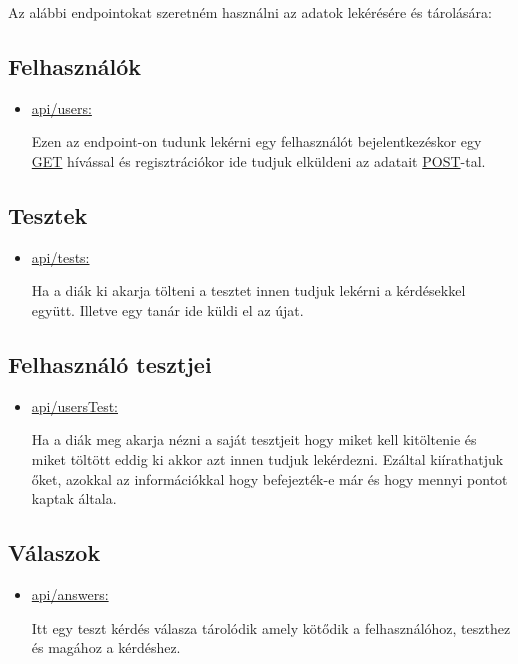 
Az alábbi endpointokat szeretném használni az adatok lekérésére és tárolására:
\subsection{Felhasználók}
\begin{itemize}[label={$\bullet$}, topsep=0pt, itemsep=0pt, leftmargin=15pt]
    \item[] {\url{api/users:}}
          \begin{addmargin}[\parindent]{0pt}
              Ezen az endpoint-on tudunk lekérni egy felhasználót bejelentkezéskor egy \url{GET} hívással és regisztrációkor ide tudjuk elküldeni az adatait \url{POST}-tal.
          \end{addmargin}
\end{itemize}

\subsection{Tesztek}
\begin{itemize}[label={$\bullet$}, topsep=0pt, itemsep=0pt, leftmargin=15pt]
    \item[] {\url{api/tests:}}
          \begin{addmargin}[\parindent]{0pt}
              Ha a diák ki akarja tölteni a tesztet innen tudjuk lekérni a kérdésekkel együtt. Illetve egy tanár ide küldi el az újat.
          \end{addmargin}
\end{itemize}

\subsection{Felhasználó tesztjei}
\begin{itemize}[label={$\bullet$}, topsep=0pt, itemsep=0pt, leftmargin=15pt]
    \item[] {\url{api/usersTest:}}
          \begin{addmargin}[\parindent]{0pt}
              Ha a diák meg akarja nézni a saját tesztjeit hogy miket kell kitöltenie és miket töltött eddig ki akkor azt innen tudjuk lekérdezni. Ezáltal kiírathatjuk őket, azokkal az információkkal hogy befejezték-e már és hogy mennyi pontot kaptak általa.
          \end{addmargin}
\end{itemize}

\subsection{Válaszok}
\begin{itemize}[label={$\bullet$}, topsep=0pt, itemsep=0pt, leftmargin=15pt]
    \item[] {\url{api/answers:}}
          \begin{addmargin}[\parindent]{0pt}
              Itt egy teszt kérdés válasza tárolódik amely kötődik a felhasználóhoz, teszthez és magához a kérdéshez.
          \end{addmargin}
\end{itemize}